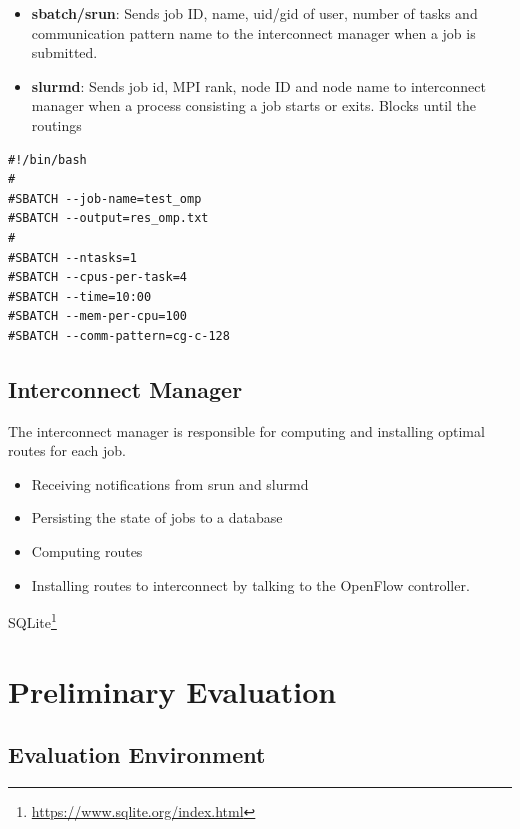 \documentclass[graybox]{svmult}
\begin{document}
\begin{itemize}
\item \textbf{sbatch/srun}: Sends job ID, name, uid/gid of user, number of
    tasks and communication pattern name to the interconnect manager when a
    job is submitted.
\item \textbf{slurmd}: Sends job id, MPI rank, node ID and node name to
    interconnect manager when a process consisting a job starts or exits.
    Blocks until the routings
\end{itemize}

\begin{lstlisting}
#!/bin/bash
#
#SBATCH --job-name=test_omp
#SBATCH --output=res_omp.txt
#
#SBATCH --ntasks=1
#SBATCH --cpus-per-task=4
#SBATCH --time=10:00
#SBATCH --mem-per-cpu=100
#SBATCH --comm-pattern=cg-c-128
\end{lstlisting}



\subsection{Interconnect Manager}

The interconnect manager is responsible for computing and installing optimal
routes for each job.

\begin{itemize}
    \item Receiving notifications from srun and slurmd
    \item Persisting the state of jobs to a database
    \item Computing routes
    \item Installing routes to interconnect by talking to the OpenFlow
        controller.
\end{itemize}


SQLite\footnote{\url{https://www.sqlite.org/index.html}}

\section{Preliminary Evaluation}\label{kt:sec:iv}

\subsection{Evaluation Environment}
\end{document}
